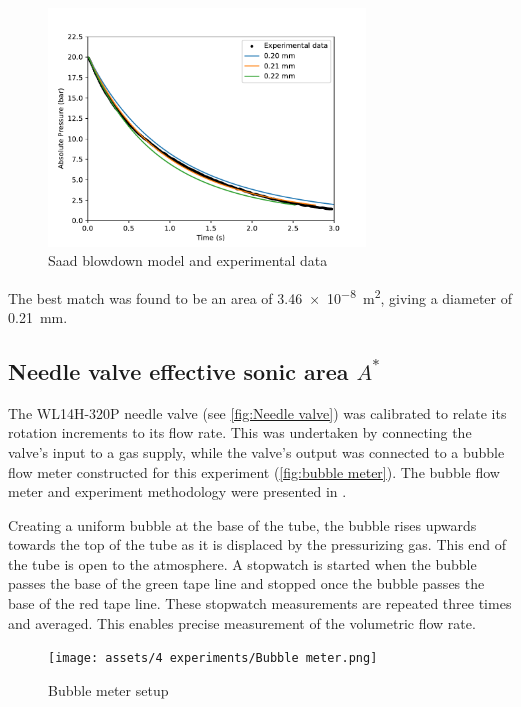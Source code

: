             \begin{figure}[!ht]
                \centering
                \includegraphics[width=0.75\textwidth]{assets/4 experiments/Saad blowdown fit.pdf}
                \caption{Saad blowdown model and experimental data}
                \label{fig:saad blowdown}
            \end{figure}

            The best match was found to be an area of \qty{3.46e-8}{m^2}, giving a diameter of \qty{0.21}{mm}.

        \subsection{Needle valve effective sonic area $A^*$}

            The WL14H-320P needle valve (see \autoref{fig:Needle valve}) was calibrated to relate its rotation increments to its flow rate. This was undertaken by connecting the valve's input to a gas supply, while the valve's output was connected to a bubble flow meter constructed for this experiment (\autoref{fig:bubble meter}). The bubble flow meter and experiment methodology were presented in \textcite{barigouFluidMechanicsSoap1993}.

            Creating a uniform bubble at the base of the tube, the bubble rises upwards towards the top of the tube as it is displaced by the pressurizing gas. This end of the tube is open to the atmosphere. A stopwatch is started when the bubble passes the base of the green tape line and stopped once the bubble passes the base of the red tape line. These stopwatch measurements are repeated three times and averaged. This enables precise measurement of the volumetric flow rate.

            \begin{figure}[!ht]
                \centering
                \texttt{[image: assets/4 experiments/Bubble meter.png]}
                \caption{Bubble meter setup}
                \label{fig:bubble meter}
            \end{figure}

